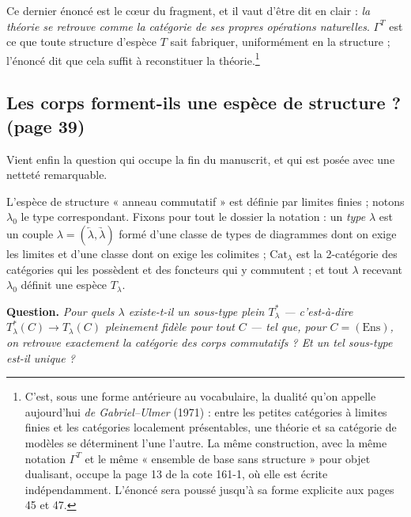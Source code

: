 \documentclass[11pt,a4paper]{article}
\begin{document}
Ce dernier énoncé est le cœur du fragment, et il vaut d'être dit en clair :
\emph{la théorie se retrouve comme la catégorie de ses propres opérations
naturelles}. $\Gamma^{T}$ est ce que toute structure d'espèce $T$ sait
fabriquer, uniformément en la structure ; l'énoncé dit que cela suffit à
reconstituer la théorie.\footnote{C'est, sous une forme antérieure au
vocabulaire, la dualité qu'on appelle aujourd'hui \emph{de Gabriel--Ulmer}
(1971) : entre les petites catégories à limites finies et les catégories
localement présentables, une théorie et sa catégorie de modèles se déterminent
l'une l'autre. La même construction, avec la même notation $\Gamma^{T}$ et le
même « ensemble de base sans structure » pour objet dualisant, occupe la
page 13 de la cote 161-1, où elle est écrite indépendamment. L'énoncé
sera poussé jusqu'à sa forme explicite aux pages 45 et 47.}

\subsection*{Les corps forment-ils une espèce de structure ? (page 39)}

Vient enfin la question qui occupe la fin du manuscrit, et qui est posée avec
une netteté remarquable.

L'espèce de structure « anneau commutatif » est définie par limites finies ;
notons $\lambda_{0}$ le type correspondant. Fixons pour tout le dossier la
notation : un \emph{type} $\lambda$ est un couple
$\lambda = (\underleftarrow{\lambda}, \underrightarrow{\lambda})$ formé d'une
classe de types de diagrammes dont on exige les limites et d'une classe dont on
exige les colimites ; $\mathrm{Cat}_{\lambda}$ est la 2-catégorie des
catégories qui les possèdent et des foncteurs qui y commutent ; et tout
$\lambda$ recevant $\lambda_{0}$ définit une espèce $T_{\lambda}$.

\textbf{Question.} \emph{Pour quels $\lambda$ existe-t-il un sous-type plein
$T^{*}_{\lambda}$ — c'est-à-dire $T^{*}_{\lambda}(C) \to T_{\lambda}(C)$
pleinement fidèle pour tout $C$ — tel que, pour $C = (\mathrm{Ens})$, on
retrouve exactement la catégorie des corps commutatifs ? Et un tel sous-type
est-il unique ?}
\end{document}
